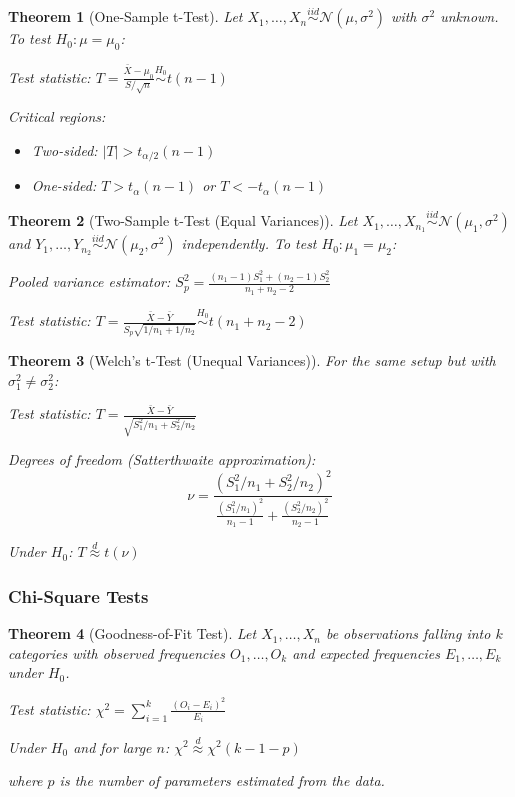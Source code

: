 \documentclass[12pt,a4paper]{article}
\newtheorem{theorem}{Theorem}[section]
\theoremstyle{remark}
\begin{document}
\begin{theorem}[One-Sample t-Test]
Let $X_1, \ldots, X_n \stackrel{iid}{\sim} \mathcal{N}(\mu, \sigma^2)$ with $\sigma^2$ unknown. To test $H_0: \mu = \mu_0$:

Test statistic: $T = \frac{\bar{X} - \mu_0}{S/\sqrt{n}} \stackrel{H_0}{\sim} t(n-1)$

Critical regions:
\begin{itemize}
\item Two-sided: $|T| > t_{\alpha/2}(n-1)$
\item One-sided: $T > t_\alpha(n-1)$ or $T < -t_\alpha(n-1)$
\end{itemize}
\end{theorem}

\begin{theorem}[Two-Sample t-Test (Equal Variances)]
Let $X_1, \ldots, X_{n_1} \stackrel{iid}{\sim} \mathcal{N}(\mu_1, \sigma^2)$ and $Y_1, \ldots, Y_{n_2} \stackrel{iid}{\sim} \mathcal{N}(\mu_2, \sigma^2)$ independently. To test $H_0: \mu_1 = \mu_2$:

Pooled variance estimator: $S_p^2 = \frac{(n_1-1)S_1^2 + (n_2-1)S_2^2}{n_1 + n_2 - 2}$

Test statistic: $T = \frac{\bar{X} - \bar{Y}}{S_p\sqrt{1/n_1 + 1/n_2}} \stackrel{H_0}{\sim} t(n_1 + n_2 - 2)$
\end{theorem}

\begin{theorem}[Welch's t-Test (Unequal Variances)]
For the same setup but with $\sigma_1^2 \neq \sigma_2^2$:

Test statistic: $T = \frac{\bar{X} - \bar{Y}}{\sqrt{S_1^2/n_1 + S_2^2/n_2}}$

Degrees of freedom (Satterthwaite approximation):
$$\nu = \frac{(S_1^2/n_1 + S_2^2/n_2)^2}{\frac{(S_1^2/n_1)^2}{n_1-1} + \frac{(S_2^2/n_2)^2}{n_2-1}}$$

Under $H_0$: $T \stackrel{d}{\approx} t(\nu)$
\end{theorem}

\subsubsection{Chi-Square Tests}

\begin{theorem}[Goodness-of-Fit Test]
Let $X_1, \ldots, X_n$ be observations falling into $k$ categories with observed frequencies $O_1, \ldots, O_k$ and expected frequencies $E_1, \ldots, E_k$ under $H_0$.

Test statistic: $\chi^2 = \sum_{i=1}^k \frac{(O_i - E_i)^2}{E_i}$

Under $H_0$ and for large $n$: $\chi^2 \stackrel{d}{\approx} \chi^2(k - 1 - p)$

where $p$ is the number of parameters estimated from the data.
\end{theorem}
\end{document}
